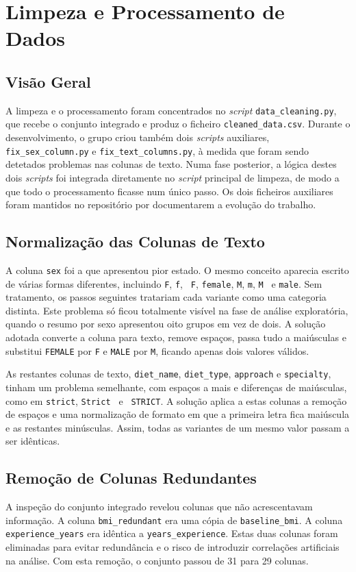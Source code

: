\chapter{Limpeza e Processamento de Dados}
\label{chap:limpeza}

\section{Visão Geral}
A limpeza e o processamento foram concentrados no \textit{script} \texttt{data\_cleaning.py}, que recebe o conjunto integrado e produz o ficheiro \texttt{cleaned\_data.csv}. Durante o desenvolvimento, o grupo criou também dois \textit{scripts} auxiliares, \texttt{fix\_sex\_column.py} e \texttt{fix\_text\_columns.py}, à medida que foram sendo detetados problemas nas colunas de texto. Numa fase posterior, a lógica destes dois \textit{scripts} foi integrada diretamente no \textit{script} principal de limpeza, de modo a que todo o processamento ficasse num único passo. Os dois ficheiros auxiliares foram mantidos no repositório por documentarem a evolução do trabalho.

\section{Normalização das Colunas de Texto}
A coluna \texttt{sex} foi a que apresentou pior estado. O mesmo conceito aparecia escrito de várias formas diferentes, incluindo \texttt{F}, \texttt{f}, \texttt{ F}, \texttt{female}, \texttt{M}, \texttt{m}, \texttt{M } e \texttt{male}. Sem tratamento, os passos seguintes tratariam cada variante como uma categoria distinta. Este problema só ficou totalmente visível na fase de análise exploratória, quando o resumo por sexo apresentou oito grupos em vez de dois. A solução adotada converte a coluna para texto, remove espaços, passa tudo a maiúsculas e substitui \texttt{FEMALE} por \texttt{F} e \texttt{MALE} por \texttt{M}, ficando apenas dois valores válidos.

As restantes colunas de texto, \texttt{diet\_name}, \texttt{diet\_type}, \texttt{approach} e \texttt{specialty}, tinham um problema semelhante, com espaços a mais e diferenças de maiúsculas, como em \texttt{strict}, \texttt{Strict } e \texttt{ STRICT}. A solução aplica a estas colunas a remoção de espaços e uma normalização de formato em que a primeira letra fica maiúscula e as restantes minúsculas. Assim, todas as variantes de um mesmo valor passam a ser idênticas.

\section{Remoção de Colunas Redundantes}
A inspeção do conjunto integrado revelou colunas que não acrescentavam informação. A coluna \texttt{bmi\_redundant} era uma cópia de \texttt{baseline\_bmi}. A coluna \texttt{experience\_years} era idêntica a \texttt{years\_experience}. Estas duas colunas foram eliminadas para evitar redundância e o risco de introduzir correlações artificiais na análise. Com esta remoção, o conjunto passou de 31 para 29 colunas.

